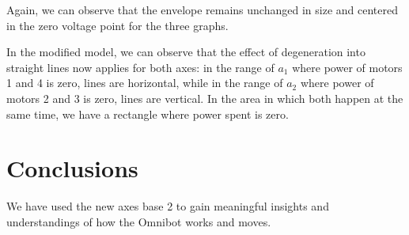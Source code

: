 \documentclass[12pt]{article}
\newcounter{lastnote}
\newenvironment{scilastnote}{%
\setcounter{lastnote}{\value{enumiv}}%
\addtocounter{lastnote}{+1}%
\begin{list}%
{\arabic{lastnote}.}
{\setlength{\leftmargin}{.22in}}
{\setlength{\labelsep}{.5em}}}
{\end{list}}
\begin{document}
Again, we can observe that the envelope remains unchanged in size and centered in the zero voltage point for the three graphs.

In the modified model, we can observe that the effect of degeneration into straight lines now applies for both axes: in the range of $a_1$ where power of motors 1 and 4 is zero, lines are horizontal, while in the range of $a_2$ where power of motors 2 and 3 is zero, lines are vertical. In the area in which both happen at the same time, we have a rectangle where power spent is zero.

\section*{Conclusions}

We have used the new axes base 2 to gain meaningful insights and understandings of how the Omnibot works and moves.


%

%








\end{document}
